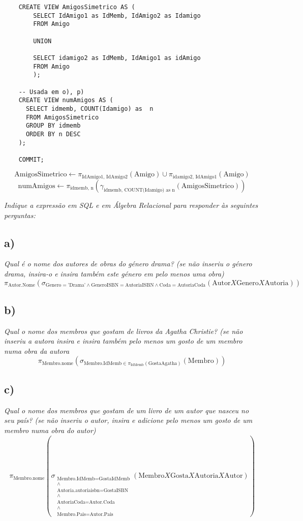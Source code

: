 \documentclass {report}
\begin{document}
\begin{lstlisting}    
    CREATE VIEW AmigosSimetrico AS (
        SELECT IdAmigo1 as IdMemb, IdAmigo2 as Idamigo
        FROM Amigo 
        
        UNION
        
        SELECT idamigo2 as IdMemb, IdAmigo1 as idAmigo
        FROM Amigo 
        );
        
    -- Usada em o), p)
    CREATE VIEW numAmigos AS (
      SELECT idmemb, COUNT(Idamigo) as  n
      FROM AmigosSimetrico
      GROUP BY idmemb
      ORDER BY n DESC
    );

    COMMIT;
\end{lstlisting}
   \[
   \text{AmigosSimetrico} \leftarrow \pi_{\text{IdAmigo1, IdAmigo2}}(\text{Amigo}) \cup \pi_{\text{idamigo2, IdAmigo1}}(\text{Amigo})
   \]
   \[
   \text{numAmigos} \leftarrow \pi_{\text{idmemb, n}}\left(\gamma_{\text{idmemb, COUNT(Idamigo) as n}}(\text{AmigosSimetrico})\right)
   \]
\vspace{0.5cm}

\textit{Indique a expressão em SQL e em Álgebra Relacional para responder às seguintes perguntas:}

\subsection{a)}
\textit{Qual é o nome dos autores de obras do género drama? (se não inseriu
o género drama, insira-o e insira também este género em pelo menos
uma obra)}
\[
\pi_{\text{Autor.Nome}}\left(\sigma_{\text{Genero} = \text{'Drama'} \land \text{GeneroISBN} = \text{AutoriaISBN} \land \text{Coda} = \text{AutoriaCoda}}(\text{Autor} X \text{Genero} X \text{Autoria})\right)
\]

\subsection{b)}
\textit{Qual o nome dos membros que gostam de livros da Agatha Christie?
(se não inseriu a autora insira e insira também pelo menos um gosto
de um membro numa obra da autora}
\[
\pi_{\text{Membro.nome}}\left(\sigma_{\text{Membro.IdMemb} \in \pi_{\text{IdMemb}}(\text{GostaAgatha})}(\text{Membro})\right)
\]

\subsection{c)}
\textit{Qual o nome dos membros que gostam de um livro de um autor que nasceu no seu país?
(se não inseriu o autor, insira e adicione pelo menos um gosto de um membro numa obra do autor)}
\[ 
\pi_{\text{Membro.nome}}\left(\sigma_{\substack{\text{Membro.IdMemb} = \text{GostaIdMemb} \\ \land \\ \text{Autoria.autoriaisbn} = \text{GostaISBN} \\ \land \\ \text{AutoriaCoda} = \text{Autor.Coda} \\ \land \\ \text{Membro.Pais} = \text{Autor.Pais}}}(\text{Membro} X \text{Gosta} X \text{Autoria} X \text{Autor})\right)
\]
\end{document}
